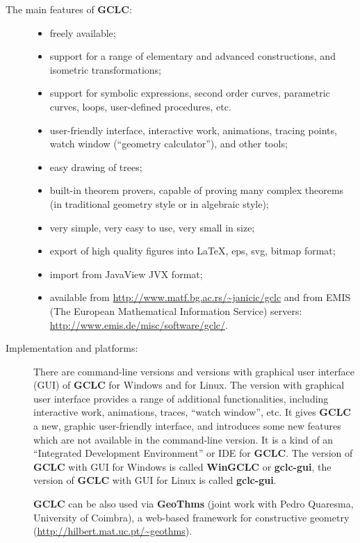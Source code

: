 \documentclass[a4paper]{book}
\newcommand{\gclc}{{\bfseries GCLC}\xspace}
\newcommand{\wingclc}{{\bfseries WinGCLC}\xspace}
\newcommand{\gclcgui}{{\bfseries gclc-gui}\xspace}
\begin{document}
\begin{description}
\item[The main features of \gclc:] \hfill
\begin{itemize}
\item freely available;
\item support for a range of elementary and advanced constructions,
and isometric transformations;
\item support for symbolic expressions, second order curves,
parametric curves, loops, user-defined procedures, etc.
\item user-friendly interface, interactive work, animations,
tracing points, watch window (``geometry calculator''), and other
tools;
\item easy drawing of trees;
\item built-in theorem provers, capable of proving many complex
theorems (in traditional geometry style or in algebraic style);
\item very simple, very easy to use, very small in size;
\item export of high quality figures into \LaTeX{}, {\sc eps},
{\sc svg}, bitmap format;
\item import from JavaView JVX format;
\item available from \url{http://www.matf.bg.ac.rs/~janicic/gclc}
and from EMIS (The European Mathematical Information Service) servers:
\url{http://www.emis.de/misc/software/gclc/}.
\end{itemize}

\item[Implementation and platforms:]
There are command-line versions and versions with graphical user 
interface (GUI) of \gclc for Windows and for Linux.
The version with graphical user interface provides a
range of additional functionalities, including interactive work,
animations, traces, ``watch window'', etc. It gives \gclc a new,
graphic user-friendly interface, and introduces some new features
which are not available in the command-line version. It is a kind
of an ``Integrated Development Environment'' or IDE for \gclc.
\index{wingclc@\wingclc}
The version of \gclc with GUI for Windows is called \wingclc
or \gclcgui,
the version of \gclc with GUI for Linux is called \gclcgui.
\index{gclc-gui@\gclcgui}

\gclc can be also used via {\bf GeoThms} (joint work with Pedro
Quaresma, University of Coimbra), a web-based framework for
constructive geometry (\url{http://hilbert.mat.uc.pt/~geothms}).


\end{description}
\end{document}
